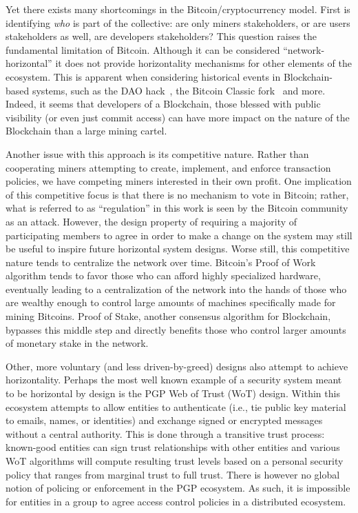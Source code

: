 Yet there exists many shortcomings in the Bitcoin/cryptocurrency model. First
is identifying \emph{who} is part of the collective: are only miners
stakeholders, or are users stakeholders as well, are developers stakeholders?
This question raises the fundamental limitation of Bitcoin. Although it can be
considered ``network-horizontal'' it does not provide  horizontality mechanisms
for other elements of the ecosystem. This is apparent when considering
historical events in Blockchain-based systems, such as the DAO hack~\cite{},
the Bitcoin Classic fork~\cite{} and more. Indeed, it seems that developers of
a Blockchain, those blessed with public visibility (or even just commit access)
can have more impact on the nature of the Blockchain than a large mining
cartel.

Another issue with this approach is its competitive nature. Rather than
cooperating miners attempting to create, implement, and enforce transaction
policies, we have competing miners interested in their own profit. One
implication of this competitive focus is that there is no mechanism to vote in
Bitcoin; rather, what is referred to as ``regulation'' in this work is seen by
the Bitcoin community as an attack. However, the design property of requiring
a majority of participating members to agree in order to make a change on the
system may still be useful to inspire future horizontal system designs. Worse
still, this competitive nature tends to centralize the network over time.
Bitcoin's Proof of Work algorithm tends to favor those who can afford highly
specialized hardware, eventually leading to a centralization of the network into
the hands of those who are wealthy enough to control large amounts of machines
specifically made for mining Bitcoins. Proof of Stake, another consensus
algorithm for Blockchain, bypasses this middle step and directly benefits those
who control larger amounts of monetary stake in the network.

Other, more voluntary (and less driven-by-greed) designs also attempt to
achieve horizontality. Perhaps the most well known example of a security system
meant to be horizontal by design is the PGP Web of Trust (WoT) design. Within
this ecosystem attempts to allow entities to authenticate (i.e., tie public key
material to emails, names, or identities) and exchange signed or encrypted
messages without a central authority. This is done through a transitive trust
process: known-good entities can sign trust relationships with other entities
and various WoT algorithms will compute resulting trust levels based on a
personal security policy that ranges from marginal trust to full trust. There is
however no global notion of policing or enforcement in the PGP ecosystem. As
such, it is impossible for entities in a group to agree access control policies
in a distributed ecosystem.

